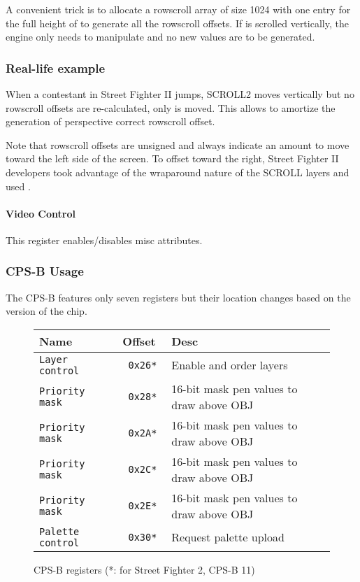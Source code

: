 A convenient trick is to allocate a rowscroll array of size 1024 with one entry for the full height of  to generate all the rowscroll offsets. If  is scrolled vertically, the engine only needs to manipulate  and no new values are to be generated.

 

\subsubsection{Real-life example}

When a contestant in Street Fighter II jumps, SCROLL2 moves vertically but no rowscroll offsets are re-calculated, only   is moved. This allows to amortize the generation of perspective correct rowscroll offset.

Note that rowscroll offsets are unsigned and always indicate an amount to move toward the left side of the screen. To offset toward the right, Street Fighter II developers took advantage of the wraparound nature of the SCROLL layers and used .

\paragraph{Video Control} This register enables/disables misc attributes.

 

\label{cpsbreg_programming}
\subsubsection{CPS-B Usage}
The CPS-B features only seven registers but their location changes based on the version of the chip.

 \begin{figure}[H]
\begin{tabularx}{\textwidth}{llX}
  \toprule    
  \textbf{Name } & \textbf{ Offset }  & \textbf{Desc }\\  
  \toprule   
  \texttt{Layer control} & \texttt{ 0x26* } & Enable and order layers\\      
\texttt{Priority mask} & \texttt{ 0x28* } &  16-bit mask pen values to draw above OBJ   \\  
\texttt{Priority mask} & \texttt{ 0x2A* } &  16-bit mask pen values to draw above OBJ   \\  
\texttt{Priority mask} & \texttt{ 0x2C* } &  16-bit mask pen values to draw above OBJ   \\  
\texttt{Priority mask} & \texttt{ 0x2E* } &  16-bit mask pen values to draw above OBJ  \\  
\texttt{Palette control} & \texttt{ 0x30* } &  Request palette upload\\ 
  \toprule   
\end{tabularx}
\caption*{CPS-B registers (*: for Street Fighter 2, CPS-B 11)}
\end{figure}

